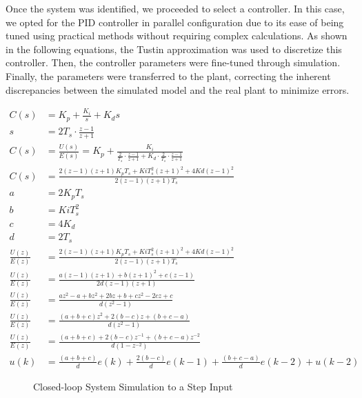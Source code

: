 \documentclass[conference,onecolumn]{IEEEtran}
\begin{document}
Once the system was identified, we proceeded to select a controller. In this case, we opted for the PID controller in parallel configuration due to its ease of being tuned using practical methods without requiring complex calculations. As shown in the following equations, the Tustin approximation was used to discretize this controller. Then, the controller parameters were fine-tuned through simulation. Finally, the parameters were transferred to the plant, correcting the inherent discrepancies between the simulated model and the real plant to minimize errors.

\begin{align}
C(s) &= K_p + \frac{K_i}{s} + K_d s \label{eq:1} \\
s &= 2T_s \cdot \frac{z - 1}{z + 1} \label{eq:2} \\
C(s) &= \frac{U(s)}{E(s)} = K_p + \frac{K_i}{\frac{2}{T_s} \cdot \frac{z - 1}{z + 1} + K_d \cdot \frac{2}{T_s} \cdot \frac{z - 1}{z + 1}} \label{eq:3} \\
C(s) &= \frac{2(z - 1)(z + 1)K_pT_s + KiT_s^2(z + 1)^2 + 4Kd(z - 1)^2}{2(z - 1)(z + 1)T_s} \label{eq:4} \\
a &= 2K_pT_s \label{eq:5} \\
b &= KiT_s^2 \label{eq:6} \\
c &= 4K_d \label{eq:7} \\
d &= 2T_s \label{eq:8} \\
\frac{U(z)}{E(z)} &= \frac{2(z - 1)(z + 1)K_pT_s + KiT_s^2(z + 1)^2 + 4Kd(z - 1)^2}{2(z - 1)(z + 1)T_s} \label{eq:9} \\
\frac{U(z)}{E(z)} &= \frac{a(z - 1)(z + 1) + b(z + 1)^2 + c(z - 1)}{2d(z - 1)(z + 1)} \label{eq:10} \\
\frac{U(z)}{E(z)} &= \frac{az^2 - a + bz^2 + 2bz + b + cz^2 - 2cz + c}{d(z^2 - 1)} \label{eq:11} \\
\frac{U(z)}{E(z)} &= \frac{(a + b + c)z^2 + 2(b - c)z + (b + c - a)}{d(z^2 - 1)} \label{eq:12} \\
\frac{U(z)}{E(z)} &= \frac{(a + b + c) + 2(b - c)z^{-1} + (b + c - a)z^{-2}}{d(1 - z^{-2})} \label{eq:13} \\
u(k) &= \frac{(a + b + c)}{d}e(k) + \frac{2(b - c)}{d}e(k - 1) + \frac{(b + c - a)}{d}e(k - 2) + u(k - 2) \label{eq:14}
\end{align}


\begin{figure}[H]
    \centering
    \caption{Closed-loop System Simulation to a Step Input}
    \label{fig:close_loop_response_simulation}
\end{figure}
\end{document}
